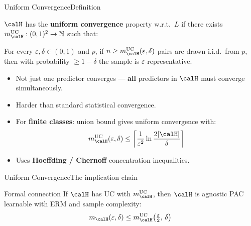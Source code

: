 \begin{frame}{Uniform Convergence}{Definition}
  \begin{mydefinition}
    $\calH$ has the \textcolor{AccentBlue}{\textbf{uniform convergence}} property w.r.t.\
    $L$ if there exists $m_\calH^{\text{UC}}:(0,1)^2\to\mathbb{N}$ such that:

    For every $\varepsilon,\delta\in(0,1)$ and $p$, if
    $n \geq m_\calH^{\text{UC}}(\varepsilon,\delta)$ pairs are drawn i.i.d.\ from $p$,
    then with probability $\geq 1-\delta$ the sample is $\varepsilon$-representative.
  \end{mydefinition}
  \bigskip
  \begin{itemize}
    \item Not just one predictor converges — \textbf{all} predictors in $\calH$ must
          converge simultaneously.
    \item Harder than standard statistical convergence.
    \item For \textbf{finite classes}: union bound gives uniform convergence with:
      \[
        m_\calH^{\text{UC}}(\varepsilon,\delta)
          \leq \left\lceil\frac{1}{\varepsilon^2}\ln\frac{2|\calH|}{\delta}\right\rceil
      \]
    \item Uses \textbf{Hoeffding / Chernoff} concentration inequalities.
  \end{itemize}
\end{frame}

\begin{frame}{Uniform Convergence}{The implication chain}
  \begin{center}
  \end{center}
  \bigskip
  \begin{block}{Formal connection}
    If $\calH$ has UC with $m_\calH^{\text{UC}}$, then $\calH$ is agnostic PAC learnable
    with ERM and sample complexity:
    \[
      m_\calH(\varepsilon,\delta)
        \leq m_\calH^{\text{UC}}\!\left(\tfrac{\varepsilon}{2},\,\delta\right)
    \]
  \end{block}
\end{frame}

